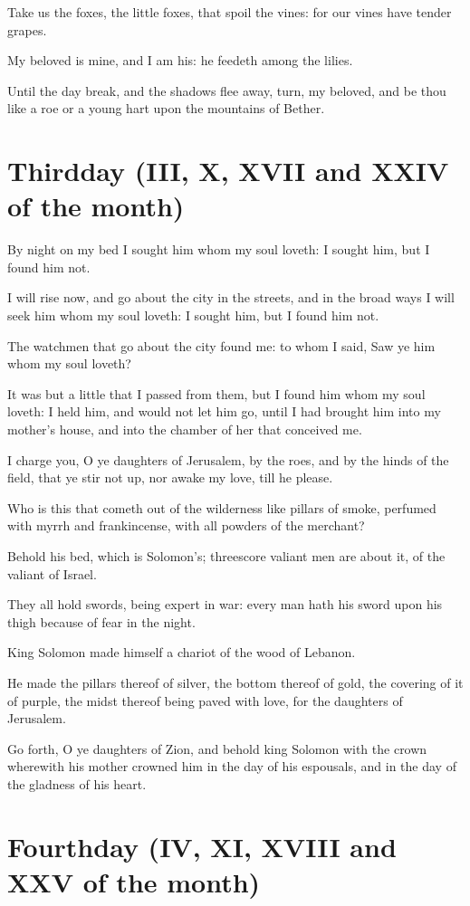 Take us the foxes, the little foxes, that spoil the vines: for our vines have tender grapes.

My beloved is mine, and I am his: he feedeth among the lilies.

Until the day break, and the shadows flee away, turn, my beloved, and be thou like a roe or a young hart upon the mountains of Bether.

\section{Thirdday (III, X, XVII and XXIV of the month)}

By night on my bed I sought him whom my soul loveth: I sought him, but I found him not.

I will rise now, and go about the city in the streets, and in the broad ways I will seek him whom my soul loveth: I sought him, but I found him not.

The watchmen that go about the city found me: to whom I said, Saw ye him whom my soul loveth?

It was but a little that I passed from them, but I found him whom my soul loveth: I held him, and would not let him go, until I had brought him into my mother's house, and into the chamber of her that conceived me.

I charge you, O ye daughters of Jerusalem, by the roes, and by the hinds of the field, that ye stir not up, nor awake my love, till he please.

Who is this that cometh out of the wilderness like pillars of smoke, perfumed with myrrh and frankincense, with all powders of the merchant?

Behold his bed, which is Solomon's; threescore valiant men are about it, of the valiant of Israel.

They all hold swords, being expert in war: every man hath his sword upon his thigh because of fear in the night.

King Solomon made himself a chariot of the wood of Lebanon.

He made the pillars thereof of silver, the bottom thereof of gold, the covering of it of purple, the midst thereof being paved with love, for the daughters of Jerusalem.

Go forth, O ye daughters of Zion, and behold king Solomon with the crown wherewith his mother crowned him in the day of his espousals, and in the day of the gladness of his heart.

\section{Fourthday (IV, XI, XVIII and XXV of the month)}

